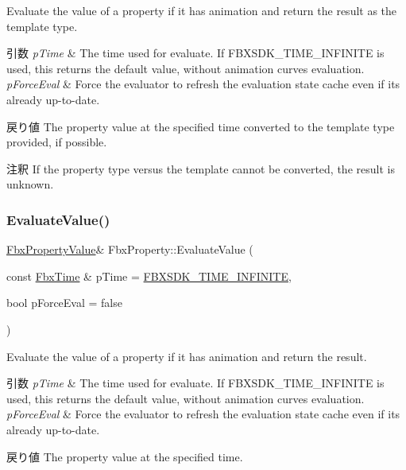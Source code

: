 Evaluate the value of a property if it has animation and return the result as the template type. 
\begin{DoxyParams}{引数}
{\em p\+Time} & The time used for evaluate. If F\+B\+X\+S\+D\+K\+\_\+\+T\+I\+M\+E\+\_\+\+I\+N\+F\+I\+N\+I\+TE is used, this returns the default value, without animation curves evaluation. \\
\hline
{\em p\+Force\+Eval} & Force the evaluator to refresh the evaluation state cache even if its already up-\/to-\/date. \\
\hline
\end{DoxyParams}
\begin{DoxyReturn}{戻り値}
The property value at the specified time converted to the template type provided, if possible. 
\end{DoxyReturn}
\begin{DoxyRemark}{注釈}
If the property type versus the template cannot be converted, the result is unknown. 
\end{DoxyRemark}
\mbox{\label{class_fbx_property_ad581a049a2f336d6a3466fdd3c8c32c0}} 
\subsubsection{\texorpdfstring{Evaluate\+Value()}{EvaluateValue()}\hspace{0.1cm}{\footnotesize\ttfamily [2/2]}}
{\footnotesize\ttfamily \hyperlink{class_fbx_property_value}{Fbx\+Property\+Value}\& Fbx\+Property\+::\+Evaluate\+Value (\begin{DoxyParamCaption}\item[{const \hyperlink{class_fbx_time}{Fbx\+Time} \&}]{p\+Time = {\ttfamily \hyperlink{fbxtime_8h_a1e6db3fe0f84f0b7daa775739f93526f}{F\+B\+X\+S\+D\+K\+\_\+\+T\+I\+M\+E\+\_\+\+I\+N\+F\+I\+N\+I\+TE}},  }\item[{bool}]{p\+Force\+Eval = {\ttfamily false} }\end{DoxyParamCaption})}

Evaluate the value of a property if it has animation and return the result. 
\begin{DoxyParams}{引数}
{\em p\+Time} & The time used for evaluate. If F\+B\+X\+S\+D\+K\+\_\+\+T\+I\+M\+E\+\_\+\+I\+N\+F\+I\+N\+I\+TE is used, this returns the default value, without animation curves evaluation. \\
\hline
{\em p\+Force\+Eval} & Force the evaluator to refresh the evaluation state cache even if its already up-\/to-\/date. \\
\hline
\end{DoxyParams}
\begin{DoxyReturn}{戻り値}
The property value at the specified time. 
\end{DoxyReturn}
\mbox{\label{class_fbx_property_af6dc98aa7ae9fd339f5b463845f56b29}} 
